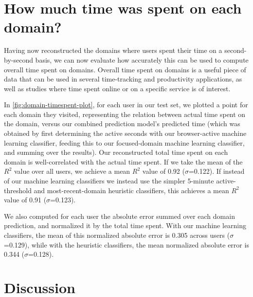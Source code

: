 \documentclass{sigchi}
\begin{document}
\section{How much time was spent on each domain?}

Having now reconstructed the domains where users spent their time on a second-by-second basis, we can now evaluate how accurately this can be used to compute overall time spent on domains. Overall time spent on domains is a useful piece of data that can be used in several time-tracking and productivity applications, as well as studies where time spent online or on a specific service is of interest.


In \autoref{fig:domain-timespent-plot}, for each user in our test set, we plotted a point for each domain they visited, representing the relation between actual time spent on the domain, versus our combined prediction model's predicted time (which was obtained by first determining the active seconds with our browser-active machine learning classifier, feeding this to our focused-domain machine learning classifier, and summing over the results). Our reconstructed total time spent on each domain is well-correlated with the actual time spent. If we take the mean of the $R^2$ value over all users, we achieve a mean $R^2$ value of 0.92 ($\sigma$=0.122). If instead of our machine learning classifiers we instead use the simpler 5-minute active-threshold and most-recent-domain heuristic classifiers, this achieves a mean $R^2$ value of 0.91 ($\sigma$=0.123).

We also computed for each user the absolute error summed over each domain prediction, and normalized it by the total time spent. With our machine learning classifiers, the mean of this normalized absolute error is 0.305 across users ($\sigma$=0.129), while with the heuristic classifiers, the mean normalized absolute error is 0.344 ($\sigma$=0.128).

\section{Discussion}
\end{document}
